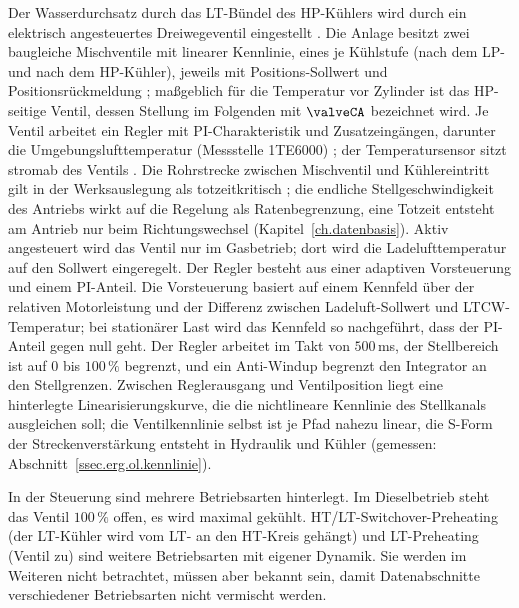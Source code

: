 Der Wasserdurchsatz durch das LT-Bündel des HP-Kühlers wird durch ein
elektrisch angesteuertes Dreiwegeventil eingestellt
\cite{everllenceseTemperaturregelventilMitAnbau2025}.
Die Anlage besitzt zwei baugleiche Mischventile mit linearer Kennlinie,
eines je Kühlstufe (nach dem LP- und nach dem HP-Kühler), jeweils mit
Positions-Sollwert und Positionsrückmeldung
\cite[S.~274--275]{everllencese4960DFProject2026}; maßgeblich für die
Temperatur vor Zylinder ist das HP-seitige Ventil, dessen Stellung im
Folgenden mit $\valveCA$ bezeichnet wird. Je Ventil arbeitet
ein Regler mit PI-Charakteristik und Zusatzeingängen, darunter die
Umgebungslufttemperatur (Messstelle 1TE6000)
\cite[S.~263]{everllencese4960DFProject2026}; der
Temperatursensor sitzt stromab des Ventils
\cite[S.~237]{everllencese4960DFProject2025}. Die Rohrstrecke zwischen
Mischventil und Kühlereintritt gilt in der Werksauslegung als
totzeitkritisch \cite[S.~381]{everllencese4960DFProject2026}; die
endliche Stellgeschwindigkeit des Antriebs wirkt auf die Regelung als
Ratenbegrenzung, eine Totzeit entsteht am Antrieb nur beim
Richtungswechsel (Kapitel~\ref{ch.datenbasis}). Aktiv angesteuert
wird das Ventil nur im Gasbetrieb; dort wird die Ladelufttemperatur auf
den Sollwert eingeregelt. Der Regler besteht aus einer adaptiven
Vorsteuerung und einem PI-Anteil. Die Vorsteuerung basiert auf einem
Kennfeld über der relativen Motorleistung und der Differenz zwischen
Ladeluft-Sollwert und LTCW-Temperatur; bei stationärer Last wird das
Kennfeld so nachgeführt, dass der PI-Anteil gegen null geht. Der Regler
arbeitet im Takt von $500\,$ms, der Stellbereich ist auf $0$ bis
$100\,\%$ begrenzt, und ein Anti-Windup begrenzt den Integrator an den
Stellgrenzen. Zwischen Reglerausgang und Ventilposition liegt eine
hinterlegte Linearisierungskurve, die die nichtlineare Kennlinie des
Stellkanals ausgleichen soll; die Ventilkennlinie selbst ist je Pfad
nahezu linear, die S-Form der Streckenverstärkung entsteht in Hydraulik
und Kühler (gemessen: Abschnitt~\ref{ssec.erg.ol.kennlinie}).


In der Steuerung sind mehrere Betriebsarten hinterlegt. Im
Dieselbetrieb steht das Ventil $100\,\%$ offen, es wird maximal
gekühlt. HT/LT-Switchover-Preheating (der LT-Kühler wird vom LT- an
den HT-Kreis gehängt) und LT-Preheating (Ventil zu) sind weitere
Betriebsarten mit eigener Dynamik. Sie werden im Weiteren nicht
betrachtet, müssen aber bekannt sein, damit Datenabschnitte
verschiedener Betriebsarten nicht vermischt werden.

